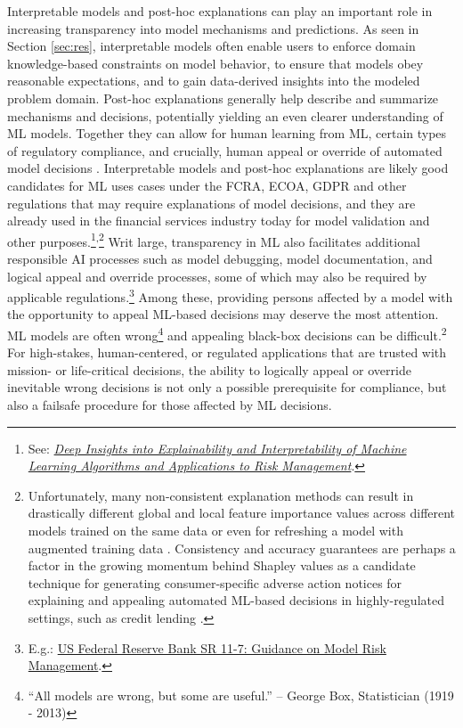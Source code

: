 \documentclass[information,article,submit,moreauthors,pdftex]{definitions/mdpi}
\begin{document}
Interpretable models and post-hoc explanations can play an important role in increasing transparency into model mechanisms and predictions. As seen in Section \ref{sec:res}, interpretable models often enable users to enforce domain knowledge-based constraints on model behavior, to ensure that models obey reasonable expectations, and to gain data-derived insights into the modeled problem domain. Post-hoc explanations generally help describe and summarize mechanisms and decisions, potentially yielding an even clearer understanding of ML models. Together they can allow for human learning from ML, certain types of regulatory compliance, and crucially, human appeal or override of automated model decisions \cite{art_and_sci}. Interpretable models and post-hoc explanations are likely good candidates for ML uses cases under the FCRA, ECOA, GDPR and other regulations that may require explanations of model decisions, and they are already used in the financial services industry today for model validation and other purposes.\footnote{See: \href{https://ww2.amstat.org/meetings/jsm/2019/onlineprogram/AbstractDetails.cfm?abstractid=303053}{\textit{Deep Insights into Explainability and Interpretability of Machine Learning Algorithms and Applications to Risk Management}}.}\textsuperscript{,}\footnote{Unfortunately, many non-consistent explanation methods can result in drastically different global and local feature importance values across different models trained on the same data or even for refreshing a model with augmented training data \cite{molnar}. Consistency and accuracy guarantees are perhaps a factor in the growing momentum behind Shapley values as a candidate technique for generating consumer-specific adverse action notices for explaining and appealing automated ML-based decisions in highly-regulated settings, such as credit lending \cite{bracke2019machine}.} Writ large, transparency in ML also facilitates additional responsible AI processes such as model debugging, model documentation, and logical appeal and override processes, some of which may also be required by applicable regulations.\footnote{E.g.: \href{https://www.federalreserve.gov/supervisionreg/srletters/sr1107.htm}{US Federal Reserve Bank SR 11-7: Guidance on Model Risk Management}.} Among these, providing persons affected by a model with the opportunity to appeal ML-based decisions may deserve the most attention. ML models are often wrong\footnote{``All models are wrong, but some are useful.'' -- George Box, Statistician (1919 - 2013)} and appealing black-box decisions can be difficult.\textsuperscript{2} For high-stakes, human-centered, or regulated applications that are trusted with mission- or life-critical decisions, the ability to logically appeal or override inevitable wrong decisions is not only a possible prerequisite for compliance, but also a failsafe procedure for those affected by ML decisions.  
\end{document}
